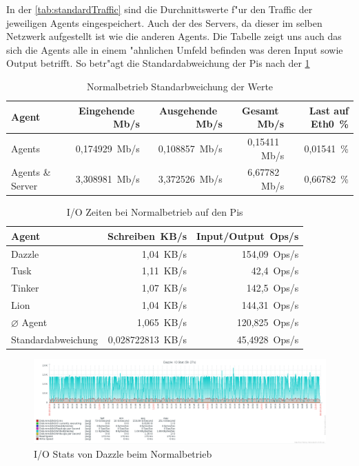 In der \cref{tab:standardTraffic} sind die Durchnittswerte f"ur den Traffic der jeweiligen Agents eingespeichert. Auch der %
des Servers, da dieser im selben Netzwerk aufgestellt ist wie die anderen Agents. Die Tabelle zeigt uns auch %
das sich die Agents alle in einem "ahnlichen Umfeld befinden was deren Input sowie Output betrifft. So betr"agt die
Standardabweichung der Pis nach der \cref{tab:standardTrafficAbweichung}     

\begin{table}
\centering
\begin{tabular}{l%
 r<{\,Mb/s}%
 r<{\,Mb/s}%
 r<{\,Mb/s}%
 r<{\,\%}%
}
Agent		& Eingehende            & Ausgehende            & Gesamt                & Last auf Eth0 \\
\hline
Agents		& 0,174929              & 0,108857              & 0,15411               &  0,01541        \\
Agents \& Server& 3,308981		& 3,372526        	& 6,67782             	&  0,66782         \\
\end{tabular}
\caption{Normalbetrieb Standarbweichung der Werte}
\label{tab:standardTrafficAbweichung}
\end{table}

\begin{table}
\centering
\begin{tabular}{l%
 r<{\,KB/s}%
 r<{\,Ops/s}%
}
Agent	  			& Schreiben	 	& Input/Output 	\\	
\hline
Dazzle 				& 1,04			& 154,09	        \\
Tusk 				& 1,11			& 42,4			\\
Tinker				& 1,07 			& 142,5		 	\\
Lion				& 1,04			& 144,31	 	\\
$\diameter $ Agent 		& 1,065			& 120,825		\\   
Standardabweichung 		& 0,028722813  		& 45,4928		\\
\end{tabular}
\caption{I/O Zeiten bei Normalbetrieb auf den Pis}
\label{tab:NormalbetriebIoStat}
\end{table}


\begin{figure}[htbp]
\centering
\includegraphics*[width=0.9\linewidth]{Abb/ZabbixDazzle/Standard/IoStatDazzleStandard}

\caption{I/O Stats von Dazzle beim Normalbetrieb}
\label{fig:IoStatDazzleStandard}
\end{figure} %

